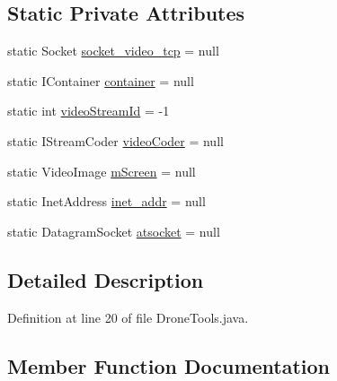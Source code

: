 \subsection*{Static Private Attributes}
\begin{DoxyCompactItemize}
\item 
static Socket \hyperlink{classworkspace_1_1_a_r_drone_capture_image_1_1src_1_1_drone_tools_ad054763d0e94e8aaed861475c641c42c}{socket\+\_\+video\+\_\+tcp} = null
\item 
static I\+Container \hyperlink{classworkspace_1_1_a_r_drone_capture_image_1_1src_1_1_drone_tools_a1c1b1c9966fa3b80bb679d60c9b93c4d}{container} = null
\item 
static int \hyperlink{classworkspace_1_1_a_r_drone_capture_image_1_1src_1_1_drone_tools_a26096ea27f8535f3e07d0fd78c73933f}{video\+Stream\+Id} = -\/1
\item 
static I\+Stream\+Coder \hyperlink{classworkspace_1_1_a_r_drone_capture_image_1_1src_1_1_drone_tools_ade856f1d7f4cc80de7a3f76b847c5c40}{video\+Coder} = null
\item 
static Video\+Image \hyperlink{classworkspace_1_1_a_r_drone_capture_image_1_1src_1_1_drone_tools_aabc23d2e4df71856499ccdfd2d494876}{m\+Screen} = null
\item 
static Inet\+Address \hyperlink{classworkspace_1_1_a_r_drone_capture_image_1_1src_1_1_drone_tools_a537370a44b88d1ed55ee857b7dbf97e1}{inet\+\_\+addr} = null
\item 
static Datagram\+Socket \hyperlink{classworkspace_1_1_a_r_drone_capture_image_1_1src_1_1_drone_tools_ac0909587a6eff1f1c97c702d25c95e78}{atsocket} = null
\end{DoxyCompactItemize}


\subsection{Detailed Description}


Definition at line 20 of file Drone\+Tools.\+java.



\subsection{Member Function Documentation}
\hypertarget{classworkspace_1_1_a_r_drone_capture_image_1_1src_1_1_drone_tools_a095e49b01ac341b6a4e7b139617ae20e}{}
